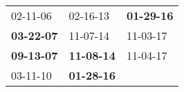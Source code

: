 \begin{supertabular}{p{0.33\columnwidth}p{0.33\columnwidth}p{0.33\columnwidth}}
          02-11-06\textsuperscript{} &           02-16-13\textsuperscript{} &  \textbf{01-29-16\textsuperscript{}} \\
 \textbf{03-22-07\textsuperscript{}} &           11-07-14\textsuperscript{} &           11-03-17\textsuperscript{} \\
 \textbf{09-13-07\textsuperscript{}} &  \textbf{11-08-14\textsuperscript{}} &           11-04-17\textsuperscript{} \\
          03-11-10\textsuperscript{} &  \textbf{01-28-16\textsuperscript{}} &                                      \\
\end{supertabular}
